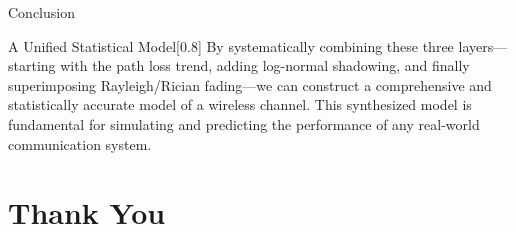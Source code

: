 \documentclass{beamer}
\begin{document}
	\begin{frame}{Conclusion}
		\begin{alertblock}{A Unified Statistical Model}[0.8\textwidth]
			By systematically combining these three layers—starting with the path loss trend, adding log-normal shadowing, and finally superimposing Rayleigh/Rician fading—we can construct a comprehensive and statistically accurate model of a wireless channel. This synthesized model is fundamental for simulating and predicting the performance of any real-world communication system.
		\end{alertblock}
	\end{frame}
	
	\section{Thank You}
	
\end{document}
